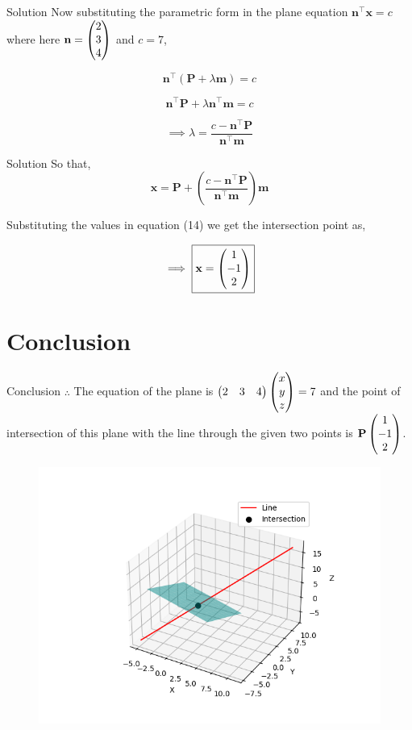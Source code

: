 \documentclass[notheorems]{beamer}
\let\vec\mathbf
\providecommand{\brak}[1]{\ensuremath{\left(#1\right)}}
\theoremstyle{remark}
\begin{document}
\begin{frame}{Solution}
    Now substituting the parametric form in the plane equation $\vec{n}^{\top}\vec{x} = c$ where here $\vec{n} = \myvec{2\\3\\4}$ and $c = 7$,

\begin{equation}
    \vec{n}^{\top}\brak{\vec{P} + \lambda \vec{m}} = c
\end{equation}

\begin{equation}
    \vec{n}^{\top}\vec{P} + \lambda \vec{n}^{\top}\vec{m} = c
\end{equation}

\begin{equation}
    \implies \lambda = \frac{c - \vec{n}^{\top}\vec{P}}{\vec{n}^{\top}\vec{m}}
\end{equation}

\end{frame}

\begin{frame}{Solution}
So that, 
\begin{equation}
  \vec{x} = \vec{P} + \brak{\frac{c - \vec{n}^{\top}\vec{P}}{\vec{n}^{\top}\vec{m}}}\vec{m}
\end{equation}

Substituting the values in equation (14) we get the intersection point as,

\begin{equation}
    \implies \fbox{$\vec{x} = \myvec{1\\-1\\2}$}
\end{equation}
\end{frame}

\section{Conclusion}
\begin{frame}{Conclusion}
$\therefore$ The equation of the plane is $\begin{pmatrix}2&3&4\end{pmatrix}\begin{pmatrix}x\\y\\z\end{pmatrix}=7$ and the point of intersection of this plane with the line through the given two points is $\vec{P}\myvec{1\\-1\\2}$.
\begin{figure}[H]
    \centering
    \includegraphics[width=0.55\columnwidth]{figs/1.png}
    \caption{}
\end{figure}
\end{frame}
\end{document}

